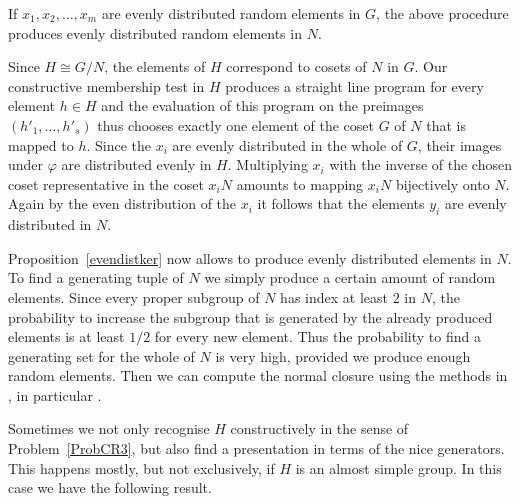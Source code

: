 \begin{Prop}
\label{evendistker}
If $x_1, x_2, \ldots, x_m$ are evenly distributed random elements in $G$,
the above procedure produces evenly distributed random elements in
$N$.
\end{Prop}
\proofbeg
Since $H \cong G/N$, the elements of $H$ correspond to cosets of $N$ in
$G$. Our constructive membership test in $H$ produces a straight
line program for every element $h \in H$ and the evaluation of this
%
program on the preimages $(h'_1, \ldots, h'_s)$ thus chooses exactly one
element of the coset $G$ of $N$ that is mapped to $h$. Since the $x_i$ are evenly
distributed in the whole of $G$, their images under $\varphi$ are
distributed evenly in $H$. Multiplying $x_i$ with the inverse of the
chosen coset representative in the coset $x_iN$ amounts to mapping
$x_i N$ bijectively onto $N$. Again by the even distribution of the $x_i$
it follows that the elements $y_i$ are evenly distributed in $N$.
\proofend

\smallskip
Proposition~\ref{evendistker} now allows to produce evenly distributed
elements in $N$. To find a generating tuple of $N$ we simply produce
a certain amount of random elements. Since every proper subgroup of $N$ 
has index at least $2$ in $N$, the probability to increase the
subgroup that is generated by the already produced elements is at least 
$1/2$ for every new element. Thus the probability to find a generating
set for the whole of $N$ is very high, provided we produce enough random
elements. Then we can compute the normal closure using
the methods in \cite[Chapter 2]{Ser}, in particular
\cite[Theorem~2.3.9]{Ser}.


\medskip
Sometimes we not only recognise $H$ constructively in the sense of
Problem~\ref{ProbCR3}, but also find a presentation in terms of the 
nice generators. This happens mostly, but not exclusively, if $H$ is an 
almost simple group. In this case we have the following result.

